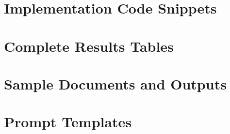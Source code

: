 \documentclass[12pt]{article}
\begin{document}
\appendix

\section{Implementation Code Snippets}

\section{Complete Results Tables}

\section{Sample Documents and Outputs}

\section{Prompt Templates}
\end{document}
